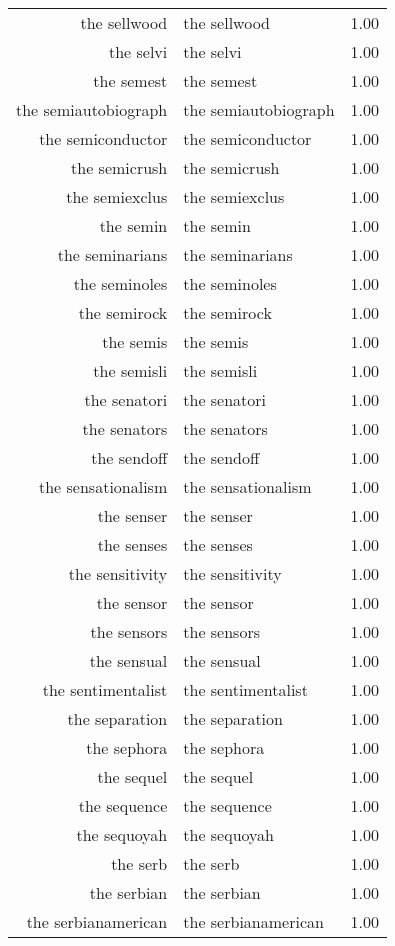 \begin{table}[ht]
\begin{tabular}{rlr}
  the sellwood & the sellwood & 1.00 \\ 
  the selvi & the selvi & 1.00 \\ 
  the semest & the semest & 1.00 \\ 
  the semiautobiograph & the semiautobiograph & 1.00 \\ 
  the semiconductor & the semiconductor & 1.00 \\ 
  the semicrush & the semicrush & 1.00 \\ 
  the semiexclus & the semiexclus & 1.00 \\ 
  the semin & the semin & 1.00 \\ 
  the seminarians & the seminarians & 1.00 \\ 
  the seminoles & the seminoles & 1.00 \\ 
  the semirock & the semirock & 1.00 \\ 
  the semis & the semis & 1.00 \\ 
  the semisli & the semisli & 1.00 \\ 
  the senatori & the senatori & 1.00 \\ 
  the senators & the senators & 1.00 \\ 
  the sendoff & the sendoff & 1.00 \\ 
  the sensationalism & the sensationalism & 1.00 \\ 
  the senser & the senser & 1.00 \\ 
  the senses & the senses & 1.00 \\ 
  the sensitivity & the sensitivity & 1.00 \\ 
  the sensor & the sensor & 1.00 \\ 
  the sensors & the sensors & 1.00 \\ 
  the sensual & the sensual & 1.00 \\ 
  the sentimentalist & the sentimentalist & 1.00 \\ 
  the separation & the separation & 1.00 \\ 
  the sephora & the sephora & 1.00 \\ 
  the sequel & the sequel & 1.00 \\ 
  the sequence & the sequence & 1.00 \\ 
  the sequoyah & the sequoyah & 1.00 \\ 
  the serb & the serb & 1.00 \\ 
  the serbian & the serbian & 1.00 \\ 
  the serbianamerican & the serbianamerican & 1.00 \\ 

\end{tabular}
\end{table}
